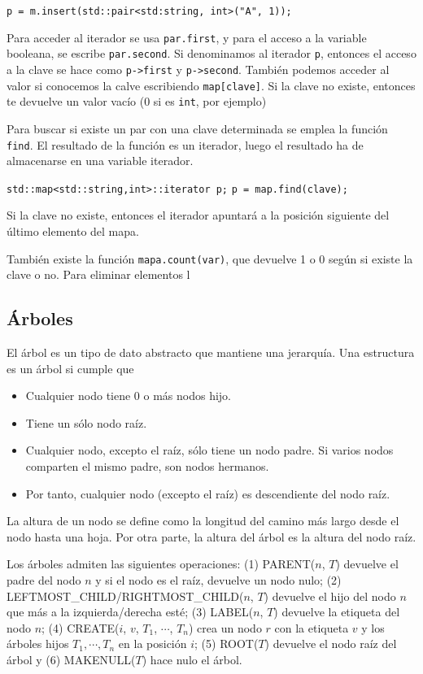 \documentclass[a4paper]{article}
\begin{document}
	\verb|p = m.insert(std::pair<std:string, int>("A", 1));|
	
	Para acceder al iterador se usa \verb|par.first|, y para el acceso a la variable booleana, se escribe \verb|par.second|. Si denominamos al iterador \verb|p|, entonces el acceso a la clave se hace como \verb|p->first| y \verb|p->second|. También podemos acceder al valor si conocemos la calve escribiendo \verb|map[clave]|. Si la clave no existe, entonces te devuelve un valor vacío (0 si es \verb|int|, por ejemplo)
	
	Para buscar si existe un par con una clave determinada se emplea la función \verb|find|. El resultado de la función es un iterador, luego el resultado ha de almacenarse en una variable iterador.
	
	\verb|std::map<std::string,int>::iterator p;|
	\verb|p = map.find(clave);|
	
	Si la clave no existe, entonces el iterador apuntará a la posición siguiente del último elemento del mapa.
	
	También existe la función \verb|mapa.count(var)|, que devuelve 1 o 0 según si existe la clave o no. Para eliminar elementos l
	
	\subsection{Árboles}
	El árbol es un tipo de dato abstracto que mantiene una jerarquía. Una estructura es un árbol si cumple que 
	\begin{itemize}
		\item Cualquier nodo tiene 0 o más nodos hijo.
		\item Tiene un sólo nodo raíz.
		\item Cualquier nodo, excepto el raíz, sólo tiene un nodo padre. Si varios nodos comparten el mismo padre, son nodos hermanos.
		\item Por tanto, cualquier nodo (excepto el raíz) es descendiente del nodo raíz.
	\end{itemize} 

	La altura de un nodo se define como la longitud del camino más largo desde el nodo hasta una hoja. Por otra parte, la altura del árbol es la altura del nodo raíz.
	
	Los árboles admiten las siguientes operaciones: (1) PARENT($n$, $T$) devuelve el padre del nodo $n$ y si el nodo es el raíz, devuelve un nodo nulo; (2) LEFTMOST\_CHILD/RIGHTMOST\_CHILD($n$, $T$) devuelve el hijo del nodo $n$ que más a la izquierda/derecha esté; (3) LABEL($n$, $T$) devuelve la etiqueta del nodo $n$; (4) CREATE($i$, $v$, $T_1$, $\cdots$, $T_n$) crea un nodo $r$ con la etiqueta $v$ y los árboles hijos $T_1, \cdots, T_n$ en la posición $i$; (5) ROOT($T$) devuelve el nodo raíz del árbol y (6) MAKENULL($T$) hace nulo el árbol.
	
\end{document}
